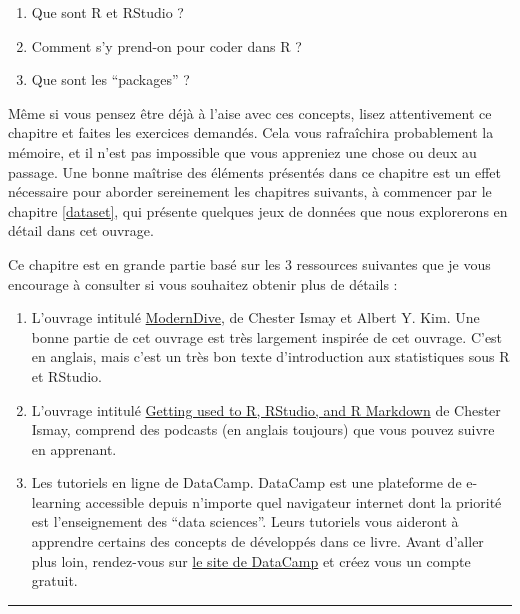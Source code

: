 \documentclass[a4paperpaper,]{article}
\providecommand{\tightlist}{%
  \setlength{\itemsep}{0pt}\setlength{\parskip}{0pt}}
\theoremstyle{definition}
\theoremstyle{definition}
\theoremstyle{definition}
\theoremstyle{remark}
\begin{document}
\begin{enumerate}
\def\labelenumi{\arabic{enumi}.}
\tightlist
\item
  Que sont R et RStudio ?
\item
  Comment s'y prend-on pour coder dans R ?
\item
  Que sont les ``packages'' ?
\end{enumerate}

Même si vous pensez être déjà à l'aise avec ces concepts, lisez
attentivement ce chapitre et faites les exercices demandés. Cela vous
rafraîchira probablement la mémoire, et il n'est pas impossible que vous
appreniez une chose ou deux au passage. Une bonne maîtrise des éléments
présentés dans ce chapitre est un effet nécessaire pour aborder
sereinement les chapitres suivants, à commencer par le chapitre
\ref{dataset}, qui présente quelques jeux de données que nous
explorerons en détail dans cet ouvrage.

Ce chapitre est en grande partie basé sur les 3 ressources suivantes que
je vous encourage à consulter si vous souhaitez obtenir plus de détails
:

\begin{enumerate}
\def\labelenumi{\arabic{enumi}.}
\tightlist
\item
  L'ouvrage intitulé
  \href{https://moderndive.com/index.html}{ModernDive}, de Chester Ismay
  et Albert Y. Kim. Une bonne partie de cet ouvrage est très largement
  inspirée de cet ouvrage. C'est en anglais, mais c'est un très bon
  texte d'introduction aux statistiques sous R et RStudio.
\item
  L'ouvrage intitulé
  \href{https://ismayc.github.io/rbasics-book/}{Getting used to R,
  RStudio, and R Markdown} de Chester Ismay, comprend des podcasts (en
  anglais toujours) que vous pouvez suivre en apprenant.
\item
  Les tutoriels en ligne de DataCamp. DataCamp est une plateforme de
  e-learning accessible depuis n'importe quel navigateur internet dont
  la priorité est l'enseignement des ``data sciences''. Leurs tutoriels
  vous aideront à apprendre certains des concepts de développés dans ce
  livre. Avant d'aller plus loin, rendez-vous sur
  \href{https://www.datacamp.com/}{le site de DataCamp} et créez vous un
  compte gratuit.
\end{enumerate}

\begin{center}\rule{0.5\linewidth}{\linethickness}\end{center}
\end{document}
